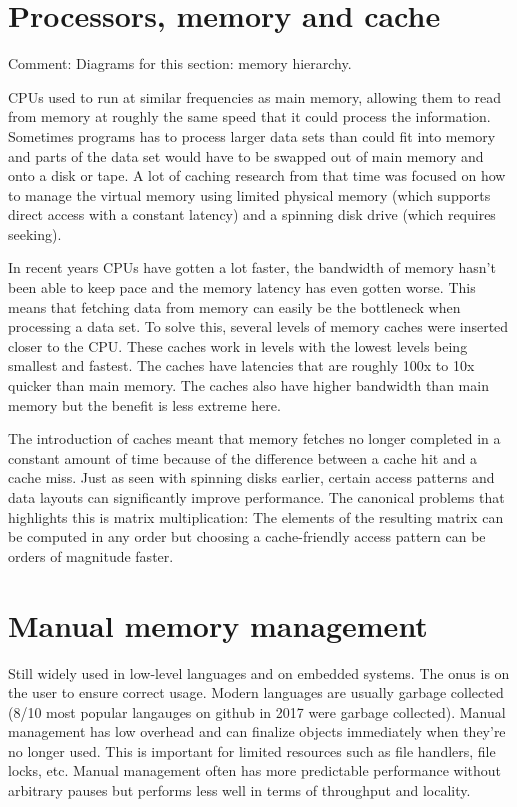 \documentclass[a4paper,oneside]{memoir}
\newcommand{\makecomment}[1]{{\color{red} Comment: #1}}
\begin{document}
\section{Processors, memory and cache}
\makecomment{Diagrams for this section: memory hierarchy.}

CPUs used to run at similar frequencies as main memory, allowing them to read
from memory at roughly the same speed that it could process the information.
Sometimes programs has to process larger data sets than could fit into memory
and parts of the data set would have to be swapped out of main memory and onto
a disk or tape. A lot of caching research from that time was focused on how to
manage the virtual memory using limited physical memory (which supports direct
access with a constant latency) and a spinning disk drive (which requires seeking).

In recent years CPUs have gotten a lot faster, the bandwidth of memory
hasn't been able to keep pace and the memory latency has even gotten worse. This
means that fetching data from memory can easily be the bottleneck when processing
a data set. To solve this, several levels of memory caches were inserted closer
to the CPU. These caches work in levels with the lowest levels being smallest
and fastest. The caches have latencies that are roughly 100x to 10x quicker
than main memory. The caches also have higher bandwidth than main memory but
the benefit is less extreme here.

The introduction of caches meant that memory fetches no longer completed in a
constant amount of time because of the difference between a cache hit and
a cache miss. Just as seen with spinning disks earlier, certain access patterns
and data layouts can significantly improve performance. The canonical problems
that highlights this is matrix multiplication: The elements of the resulting
matrix can be computed in any order but choosing a cache-friendly access pattern
can be orders of magnitude faster.


\section{Manual memory management}
Still widely used in low-level languages and on embedded systems.
The onus is on the user to ensure correct usage.
Modern languages are usually garbage collected (8/10 most popular langauges on
github\cite{GithubLanguages} in 2017 were garbage collected).
Manual management has low overhead and can finalize objects immediately when
they're no longer used. This is important for limited resources such as file
handlers, file locks, etc.
Manual management often has more predictable performance without arbitrary pauses
but performs less well in terms of throughput and locality.
\end{document}
